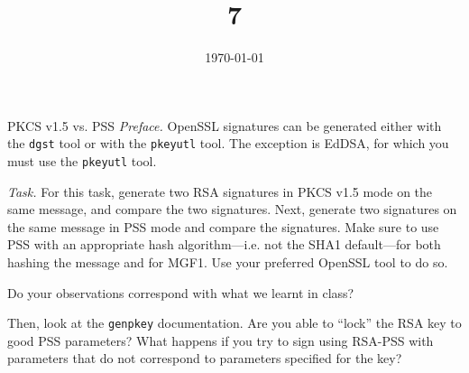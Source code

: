\documentclass{practice}
\title{7}
\date{\today}
\begin{document}
\maketitle

\begin{task}{PKCS v1.5 vs. PSS}
  \textit{Preface.}
  OpenSSL signatures can be generated either with the \texttt{dgst} tool or with the \texttt{pkeyutl} tool.
  The exception is EdDSA, for which you must use the \texttt{pkeyutl} tool.

  \textit{Task.}
  For this task, generate two RSA signatures in PKCS v1.5 mode on the same message, and compare the two signatures.
  Next, generate two signatures on the same message in PSS mode and compare the signatures.
  Make sure to use PSS with an appropriate hash algorithm---i.e. not the SHA1 default---for both hashing the message and for MGF1.
  Use your preferred OpenSSL tool to do so.
  
  Do your observations correspond with what we learnt in class?

  Then, look at the \texttt{genpkey} documentation.
  Are you able to \enquote{lock} the RSA key to good PSS parameters?
  What happens if you try to sign using RSA-PSS with parameters that do not correspond to parameters specified for the key?
\end{task}
\end{document}
